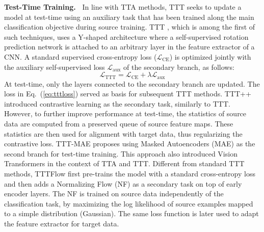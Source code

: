 \documentclass{article}
\newcommand{\mypar}[1]{\vspace{3pt}\noindent\textbf{#1~}}
\newcommand{\mr}[1]{\mathrm{#1}}
\newcommand{\Loss}{\mathcal{L}}
\begin{document}
\mypar{Test-Time Training.} In line with TTA methods, TTT seeks to update a model at test-time using an auxiliary task that has been trained along the main classification objective during source training. TTT \cite{ttt}, which is among the first of such techniques, uses a Y-shaped architecture where a self-supervised rotation prediction network is attached to an arbitrary layer in the feature extractor of a CNN. A standard supervised cross-entropy loss ($ \Loss_{\mr{CE}}$) is optimized jointly with the auxiliary self-supervised loss $\Loss_{\mr{aux}}$ of the secondary branch, as follows:
\begin{equation}
    \Loss_{\mr{TTT}} = \Loss_{\mr{CE}} + \lambda \Loss_{\mr{aux}}
    \label{eq:tttloss}
\end{equation}
At test-time, only the layers connected to the secondary branch are updated. The loss in Eq.~(\ref{eq:tttloss}) served as basis for subsequent TTT methods. TTT++ \cite{ttt++} introduced contrastive learning as the secondary task, similarly to TTT. However, to further improve performance at test-time, the statistics of source data are computed from a preserved queue of source feature maps. These statistics are then used for alignment with target data, thus regularizing the contrastive loss. TTT-MAE \cite{tttmask} proposes using Masked Autoencoders (MAE) \cite{mae} as the second branch for test-time training. This approach also introduced Vision Transformers \cite{vit} in the context of TTA and TTT. Different from standard TTT methods, TTTFlow \cite{tttflow} first pre-trains the model with a standard cross-entropy loss and then adds a Normalizing Flow (NF) \cite{realnvp,glow} as a secondary task on top of early encoder layers. The NF is trained on source data independently of the classification task, by maximizing the log likelihood of source examples mapped to a simple distribution (Gaussian). The same loss function is later used to adapt the feature extractor for target data.


\end{document}
